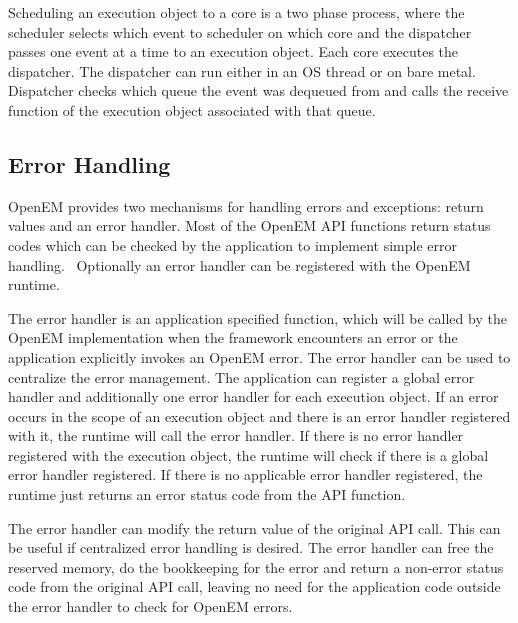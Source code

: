 Scheduling an execution object to a core is a two phase process, where the scheduler selects which event to scheduler on which core and the dispatcher passes one event at a time to an execution object. Each core executes the dispatcher. The dispatcher can run either in an OS thread or on bare metal. Dispatcher checks which queue the event was dequeued from and calls the receive function of the execution object associated with that queue.~\cite{openemintro}

\subsection{Error Handling}
\label{subsec:error}
OpenEM provides two mechanisms for handling errors and exceptions: return values and an error handler. Most of the OpenEM API functions return status codes which can be checked by the application to implement simple error handling.~\cite{openempage} Optionally an error handler can be registered with the OpenEM runtime.

The error handler is an application specified function, which will be called by the OpenEM implementation when the framework encounters an error or the application explicitly invokes an OpenEM error. The error handler can be used to centralize the error management. The application can register a global error handler and additionally one error handler for each execution object. If an error occurs in the scope of an execution object and there is an error handler registered with it, the runtime will call the error handler. If there is no error handler registered with the execution object, the runtime will check if there is a global error handler registered. If there is no applicable error handler registered, the runtime just returns an error status code from the API function.~\cite{openempage}

The error handler can modify the return value of the original API call. This can be useful if centralized error handling is desired. The error handler can free the reserved memory, do the bookkeeping for the error and return a non-error status code from the original API call, leaving no need for the application code outside the error handler to check for OpenEM errors.~\cite{openempage}

